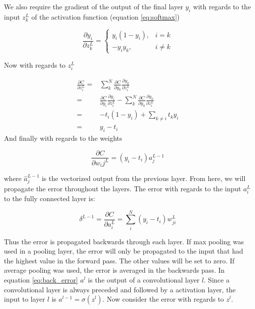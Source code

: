\documentclass[thesis.tex]{subfiles}
\begin{document}
We also require the gradient of the output of the final layer $y_i$ with regards to the input $z_k^L$ of the activation function (equation \ref{eq:softmax})

\begin{equation}
  \frac{\partial y_i}{\partial z_k^L} = 
  \begin{cases}
      y_i(1 - y_i), & i = k\\
      -y_iy_k, & i \ne k
  \end{cases}
\end{equation}

Now with regards to $z_i^L$

\begin{equation}
  \begin{aligned}
  \frac{\partial C}{\partial z_i^L} = & \sum_k^N \frac{\partial C}{\partial y_k}\frac{\partial y_k}{\partial z_i^L} \\
  = & \frac{\partial C}{\partial y_i}\frac{\partial y_i}{\partial z_i^L} - \sum_k^N \frac{\partial C}{\partial y_k}\frac{\partial y_k}{\partial z_i^L} \\
  = & -t_i(1 - y_i) + \sum_{k \ne i}t_ky_i \\
  = & y_i - t_i
  \end{aligned}
\end{equation}
And finally with regards to the weights

\begin{equation}
   \frac{\partial C}{\partial w_ij^L} = (y_i - t_i)a_j^{L-1}
\end{equation}

where $\hat{a}_{j}^{L-1}$ is the vectorized output from the previous layer. From here, we will propagate the error throughout the layers. The error with regards to the input $a_i^L$ to the fully connected layer is:

\begin{equation} %
  \delta^{L-1} = \frac{\partial C}{\partial a_i^L} = \sum_i^N (y_i - t_i)w_{ji}^{L}
  \label{eq:back_error}
\end{equation}

Thus the error is propagated backwards through each layer. If max pooling was used in a pooling layer, the error will only be propagated to the input that had the highest value in the forward pass. The other values will be set to zero. If average pooling was used, the error is averaged in the backwards pass.
In equation \ref{eq:back_error} $a^l$ is the output of a convolutional layer $l$. Since a convolutional layer is always preceded and followed by a activation layer, the input to layer $l$ is $a^{l-1} = \sigma(z^l)$. Now consider the error with regards to $z^l$.
\end{document}

